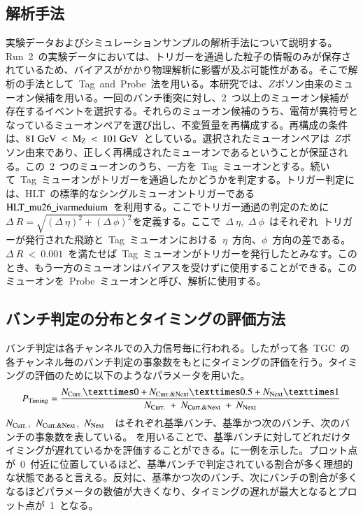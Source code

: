\subsection{解析手法}
実験データおよびシミュレーションサンプルの解析手法について説明する。
Run~2~の実験データにおいては、トリガーを通過した粒子の情報のみが保存されているため、バイアスがかかり物理解析に影響が及ぶ可能性がある。そこで解析の手法として~Tag~and~Probe~法を用いる。本研究では、$Z$ボソン由来のミューオン候補を用いる。一回のバンチ衝突に対し、2~つ以上のミューオン候補が存在するイベントを選択する。それらのミューオン候補のうち、電荷が異符号となっているミューオンペアを選び出し、不変質量を再構成する。再構成の条件は、$81~\rm{GeV}~<~M_{Z}~<~101~\rm{GeV}$~としている。選択されたミューオンペアは~$Z$ボソン由来であり、正しく再構成されたミューオンであるということが保証される。この~2~つのミューオンのうち、一方を~Tag~ミューオンとする。続いて~Tag~ミューオンがトリガーを通過したかどうかを判定する。トリガー判定には、HLT~の標準的なシングルミューオントリガーである~$\rm{HLT\_mu26\_ivarmeduium}$~を利用する。ここでトリガー通過の判定のために~$\Delta~R=\sqrt{(\Delta~\eta)^2+(\Delta~\phi)^2}$を定義する。ここで~$\Delta~\eta$,~$\Delta~\phi$~はそれぞれ~トリガーが発行された飛跡と~Tag~ミューオンにおける~$\eta$~方向、$\phi$~方向の差である。$\Delta~R~<~0.001$~を満たせば~Tag~ミューオンがトリガーを発行したとみなす。このとき、もう一方のミューオンはバイアスを受けずに使用することができる。このミューオンを~Probe~ミューオンと呼び、解析に使用する。

\subsection{バンチ判定の分布とタイミングの評価方法}
バンチ判定は各チャンネルでの入力信号毎に行われる。したがって各~TGC~の各チャンネル毎のバンチ判定の事象数をもとにタイミングの評価を行う。タイミングの評価のために以下のようなパラメータを用いた。
\begin{align}
    \it{P_{\rm{Timing}}}=\frac{\it{N_{\rm{Curr.}}}×\rm{0}+\it{N_{\rm{Curr.\&Next}}}×\rm{0.5}+\it{N_{\rm{Next}}}×\rm{1}}{\it{N_{\rm{Curr.}}}~+~\it{N_{\rm{Curr.\&Next}}}~+~\it{N_{\rm{Next}}}} \label{eq:timing}
\end{align}
$\it{N_{\rm{Curr.}}}$,~$\it{N_{\rm{Curr.\&Next}}}$,~$\it{N_{\rm{Next}}}$~~はそれぞれ基準バンチ、基準かつ次のバンチ、次のバンチの事象数を表している。
を用いることで、基準バンチに対してどれだけタイミングが遅れているかを評価することができる。に一例を示した。プロット点が~0~付近に位置しているほど、基準バンチで判定されている割合が多く理想的な状態であると言える。反対に、基準かつ次のバンチ、次にバンチの割合が多くなるほどパラメータの数値が大きくなり、タイミングの遅れが最大となるとプロット点が~1~となる。


